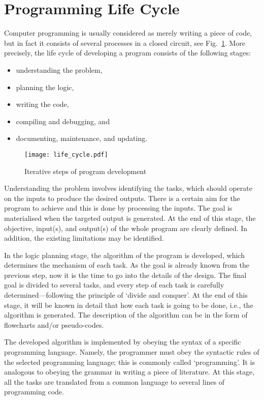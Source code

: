 \section{Programming Life Cycle}
	Computer programming is usually considered as merely writing a piece of code, but in fact it consists of several processes in a closed circuit, see Fig.~\ref{figure:programdevelopment}. More precisely, the life cycle of developing a program consists of the following stages:
	\begin{itemize}
	\item understanding the problem, 
	\item planning the logic, 
	\item writing the code, 
	\item compiling and debugging, and
	\item documenting, maintenance, and updating.
	\end{itemize}

\begin{figure}[!t]
	\centering
	\texttt{[image: life\_cycle.pdf]}
	\caption{Iterative steps of program development}
	\label{figure:programdevelopment}
\end{figure}%
	
	Understanding the problem involves identifying the tasks, which should operate on the inputs to produce the desired outputs. There is a certain aim for the program to achieve and this is done by processing the inputs. The goal is materialised when the targeted output is generated. At the end of this stage, the objective, input(s), and output(s) of the whole program are clearly defined. In addition, the existing limitations may be identified.

	In the logic planning stage, the algorithm of the program is developed, which determines the mechanism of each task. As the goal is already known from the previous step, now it is the time to go into the details of the design. The final goal is divided to several tasks, and every step of each task is carefully determined---following the principle of `divide and conquer'. At the end of this stage, it will be known in detail that how each task is going to be done, i.e., the algorithm is generated. The description of the algorithm can be in the form of flowcharts and/or pseudo-codes.
	
	The developed algorithm is implemented by obeying the syntax of a specific programming language. Namely, the programmer must obey the syntactic rules of the selected programming language; this is commonly called `programming'. It is analogous to obeying the grammar in writing a piece of literature. At this stage, all the tasks are translated from a common language to several lines of programming code.

